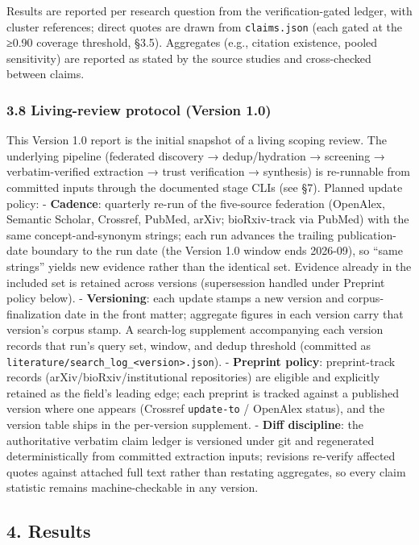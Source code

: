 \documentclass[11pt]{article}
\begin{document}
Results are reported per research question from the verification-gated
ledger, with cluster references; direct quotes are drawn from
\texttt{claims.json} (each gated at the ≥0.90 coverage threshold, §3.5).
Aggregates (e.g., citation existence, pooled sensitivity) are reported
as stated by the source studies and cross-checked between claims.

\subsubsection{3.8 Living-review protocol (Version
1.0)}\label{living-review-protocol-version-1.0}

This Version 1.0 report is the initial snapshot of a living scoping
review. The underlying pipeline (federated discovery → dedup/hydration →
screening → verbatim-verified extraction → trust verification →
synthesis) is re-runnable from committed inputs through the documented
stage CLIs (see §7). Planned update policy: - \textbf{Cadence}:
quarterly re-run of the five-source federation (OpenAlex, Semantic
Scholar, Crossref, PubMed, arXiv; bioRxiv-track via PubMed) with the
same concept-and-synonym strings; each run advances the trailing
publication-date boundary to the run date (the Version 1.0 window ends
2026-09), so ``same strings'' yields new evidence rather than the
identical set. Evidence already in the included set is retained across
versions (supersession handled under Preprint policy below). -
\textbf{Versioning}: each update stamps a new version and
corpus-finalization date in the front matter; aggregate figures in each
version carry that version's corpus stamp. A search-log supplement
accompanying each version records that run's query set, window, and
dedup threshold (committed as
\texttt{literature/search\_log\_\textless{}version\textgreater{}.json}).
- \textbf{Preprint policy}: preprint-track records
(arXiv/bioRxiv/institutional repositories) are eligible and explicitly
retained as the field's leading edge; each preprint is tracked against a
published version where one appears (Crossref \texttt{update-to} /
OpenAlex status), and the version table ships in the per-version
supplement. - \textbf{Diff discipline}: the authoritative verbatim claim
ledger is versioned under git and regenerated deterministically from
committed extraction inputs; revisions re-verify affected quotes against
attached full text rather than restating aggregates, so every claim
statistic remains machine-checkable in any version.

\subsection{4. Results}\label{results}
\end{document}
